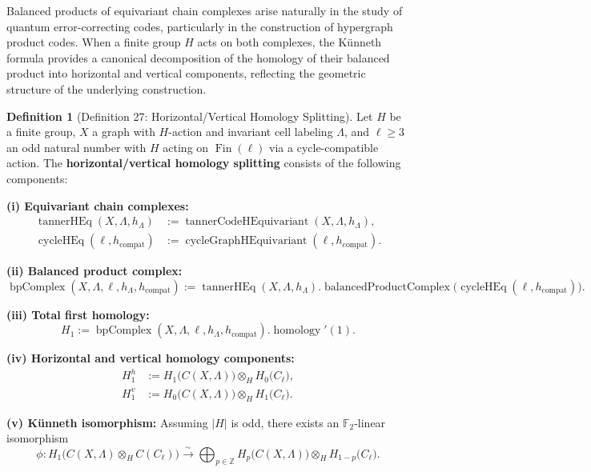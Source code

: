 \documentclass[11pt]{article}
\theoremstyle{plain}
\theoremstyle{definition}
\newtheorem*{definition}{Definition}
\theoremstyle{remark}
\begin{document}
Balanced products of equivariant chain complexes arise naturally in the study of quantum error-correcting codes, particularly in the construction of hypergraph product codes. When a finite group $H$ acts on both complexes, the Künneth formula provides a canonical decomposition of the homology of their balanced product into horizontal and vertical components, reflecting the geometric structure of the underlying construction.

\begin{definition}[Definition 27: Horizontal/Vertical Homology Splitting]
Let $H$ be a finite group, $X$ a graph with $H$-action and invariant cell labeling $\Lambda$, and $\ell \geq 3$ an odd natural number with $H$ acting on $\operatorname{Fin}(\ell)$ via a cycle-compatible action. The \textbf{horizontal/vertical homology splitting} consists of the following components:

\textbf{(i) Equivariant chain complexes:}
\begin{align}
\operatorname{tannerHEq}(X, \Lambda, h_\Lambda) &:= \operatorname{tannerCodeHEquivariant}(X, \Lambda, h_\Lambda), \\
\operatorname{cycleHEq}(\ell, h_{\mathrm{compat}}) &:= \operatorname{cycleGraphHEquivariant}(\ell, h_{\mathrm{compat}}).
\end{align}

\textbf{(ii) Balanced product complex:}
\[
\operatorname{bpComplex}(X, \Lambda, \ell, h_\Lambda, h_{\mathrm{compat}}) := \operatorname{tannerHEq}(X, \Lambda, h_\Lambda).\operatorname{balancedProductComplex}\!\bigl(\operatorname{cycleHEq}(\ell, h_{\mathrm{compat}})\bigr).
\]

\textbf{(iii) Total first homology:}
\[
H_1 := \operatorname{bpComplex}(X, \Lambda, \ell, h_\Lambda, h_{\mathrm{compat}}).\operatorname{homology}'(1).
\]

\textbf{(iv) Horizontal and vertical homology components:}
\begin{align}
H_1^h &:= H_1\!\bigl(C(X, \Lambda)\bigr) \otimes_H H_0\!\bigl(C_\ell\bigr), \\
H_1^v &:= H_0\!\bigl(C(X, \Lambda)\bigr) \otimes_H H_1\!\bigl(C_\ell\bigr).
\end{align}

\textbf{(v) Künneth isomorphism:} Assuming $|H|$ is odd, there exists an $\mathbb{F}_2$-linear isomorphism
\[
\phi : H_1\!\bigl(C(X,\Lambda) \otimes_H C(C_\ell)\bigr) \xrightarrow{\sim} \bigoplus_{p \in \mathbb{Z}} H_p\!\bigl(C(X,\Lambda)\bigr) \otimes_H H_{1-p}\!\bigl(C_\ell\bigr).
\]


\end{definition}
\end{document}
